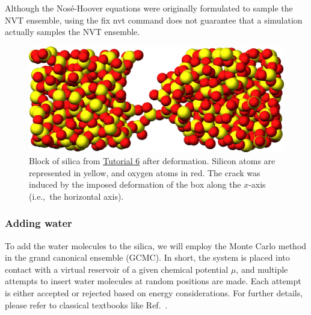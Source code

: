 \documentclass[9pt,tutorial]{livecoms}
\newcommand{\lmpcmd}[1]{\hspace{0pt}\colorbox{listing}{\textcolor{command}{\small{#1}}}\hspace{0pt}} %
\begin{document}
\begin{note}
{\color{blue}Although the Nosé-Hoover equations were originally formulated to sample the
NVT ensemble, using the \lmpcmd{fix nvt} command does not guarantee that 
a simulation actually samples the NVT ensemble.}
\end{note}

\begin{figure}
\centering
\includegraphics[width=\linewidth]{GCMC-cracked}
\caption{Block of silica from \hyperref[gcmc-silica-label]{Tutorial 6}
after deformation.  Silicon atoms are represented in yellow,
and oxygen atoms in red.  The crack was induced by the
imposed deformation of the box along the $x$-axis (i.e.,~the horizontal axis).}
\label{fig:GCMC-cracked}
\end{figure}

\subsubsection{Adding water}

To add the water molecules to the silica, we will employ the Monte Carlo
method in the grand canonical ensemble (GCMC).  In short, the system is
placed into contact with a virtual reservoir of a given chemical
potential $\mu$, and multiple attempts to insert water molecules at
random positions are made.  Each attempt is either accepted or rejected
based on energy considerations.  For further details, please refer to
classical textbooks like Ref.~.

\end{document}
